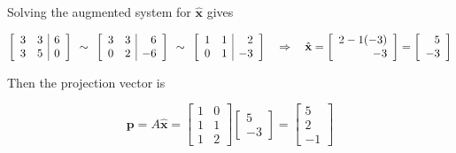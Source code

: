 \documentclass[12pt]{article}
\newcommand{\hs}{\hspace{.75mm}}
\newcommand{\nin}{\noindent}
\newcommand{\vthree}{\vspace{3mm}}
\newcommand{\mymat}[1]{
\left[
\begin{array}{rrrrrrrrrrrrrrrrrrrrrrrrrrrrrrrrrrrrrrr}
#1
\end{array}
\right]
}
\newcommand{\bx}{\mathbf{x}}
\newcommand{\bp}{\mathbf{p}}
\newcommand{\ba}{\mathbf{a}}
\newcommand{\bfb}{\mathbf{b}}
\begin{document}
\vthree

\nin Solving the augmented system for $\hat{\bx}$ gives

\[
\left[
\begin{array}{rr|r}
3 & 3 & 6 \\
3 & 5 & 0
\end{array}
\right]
\hs\hs \sim \hs\hs
\left[
\begin{array}{rr|r}
3 & 3 & 6 \\
0 & 2 &-6
\end{array}
\right]
\hs\hs \sim \hs\hs
\left[
\begin{array}{rr|r}
1 & 1 & 2 \\
0 & 1 &-3
\end{array}
\right]
\quad \Rightarrow \quad
\hat{\bx} =
\mymat{
2 - 1(-3) \\
-3
}
=
\mymat{
5 \\
-3
}
\]

\vthree

\nin Then the projection vector is

\[
\bp = A\hat{\bx} =
\mymat{
1 & 0 \\
1 & 1 \\
1 & 2
}
\mymat{
5 \\-3
}
=
\mymat{
5 \\ 2 \\ -1
}
\]

\vthree







\end{document}
